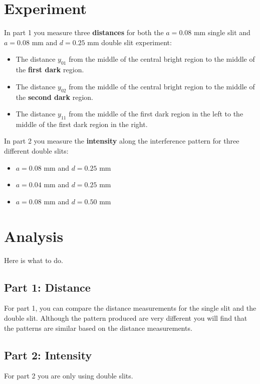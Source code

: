 \section{Experiment}
In part 1 you measure three \textbf{distances} for both the $a = 0.08$ mm single slit and $a = 0.08$ mm and $d = 0.25$ mm double slit experiment:
\begin{itemize}
	\item The distance $y_{01}$ from the middle of the central bright region to the middle of the \textbf{first dark} region.
	\item The distance $y_{02}$ from the middle of the central bright region to the middle of the \textbf{second dark} region.
	\item The distance $y_{11}$ from the middle of the first dark region in the left to the middle of the first dark region in the right.
\end{itemize}
In part 2 you measure the \textbf{intensity} along the interference pattern for three different double slits:
\begin{itemize}
	\item $a = 0.08$ mm and $d = 0.25$ mm
	\item $a = 0.04$ mm and $d = 0.25$ mm
	\item $a = 0.08$ mm and $d = 0.50$ mm
\end{itemize}
\section{Analysis}
Here is what to do.
\subsection{Part 1: Distance}
For part 1, you can compare the distance measurements for the single slit and the double slit. Although the pattern produced are very different you will find that the patterns are similar based on the distance measurements.
\subsection{Part 2: Intensity}
For part 2 you are only using double slits.

